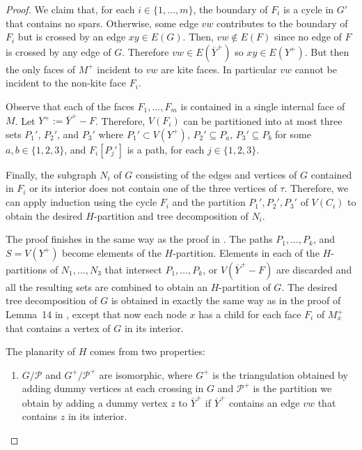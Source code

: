 \documentclass{patmorin}
\begin{document}
\begin{proof}
  We claim that, for each $i\in\{1,\ldots,m\}$, the boundary of $F_i$ is a cycle in $G'$ that contains no spars. Otherwise, some edge $vw$ contributes to the boundary of $F_i$ but is crossed by an edge $xy\in E(G)$. Then, $vw\not\in E(F)$ since no edge of $F$ is crossed by any edge of $G$. Therefore $vw\in E(\overline{Y}^+)$ so $xy\in E(Y^+)$. But then the only faces of $M^+$ incident to $vw$ are kite faces.  In particular $vw$ cannot be incident to the non-kite face $F_i$.
  
  
  Observe that each of the faces $F_1,\ldots,F_m$ is contained in a single internal face of $M$.   Let $Y^+ := \overline{Y}^+-F$. Therefore, $V(F_i)$ can be partitioned into at most three sets $P_1'$, $P_2'$, and $P_3'$ where $P_1'\subset V(Y^+)$, $P_2'\subseteq P_a$, $P_3'\subseteq P_b$ for some $a,b\in\{1,2,3\}$, and $F_i[P_j']$ is a path, for each $j\in\{1,2,3\}$. 

  Finally, the subgraph $N_i$ of $G$ consisting of the edges and vertices of $G$ contained in $F_i$ or its interior does not contain one of the three vertices of $\tau$. Therefore, we can apply induction using the cycle $F_i$ and the partition $P_1',P_2',P_3'$ of $V(C_i)$ to obtain the desired $H$-partition and tree decomposition of $N_i$.
  
  The proof finishes in the same way as the proof in \cite{dujmovic.joret.ea:planar}.  The paths $P_1,\ldots,P_k$, and $S=V(Y^+)$ become elements of the $H$-partition. 
   Elements in each of the $H$-partitions of $N_1,\ldots,N_3$ that intersect $P_1,\ldots,P_k$, or $V(\overline{Y}^+-F)$ are discarded and all the resulting sets are combined to obtain an $H$-partition of $G$.  The desired tree decomposition of $G$ is obtained in exactly the same way as in the proof of Lemma~14 in \cite{dujmovic.joret.ea:planar}, except that now each node $x$ has a child for each face $F_i$ of $M^+_x$ that contains a vertex of $G$ in its interior.
  
  The planarity of $H$ comes from two properties:
  \begin{enumerate}
    \item $G/\mathcal{P}$ and $G^+/\mathcal{P^+}$ are isomorphic, where $G^+$ is the triangulation obtained by adding dummy vertices at each crossing in $G$ and $\mathcal{P}^+$ is the partition we obtain by adding a dummy vertex $z$ to $\overline{Y}^+$ if $\overline{Y}^+$ contains an edge $vw$ that contains $z$ in its interior.  
    

\end{enumerate}
\end{proof}
\end{document}

